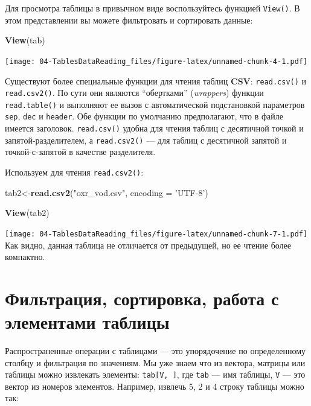 \documentclass[]{book}
\newenvironment{Shaded}{\begin{snugshade}}{\end{snugshade}}
\newcommand{\KeywordTok}[1]{\textcolor[rgb]{0.13,0.29,0.53}{\textbf{#1}}}
\newcommand{\DataTypeTok}[1]{\textcolor[rgb]{0.13,0.29,0.53}{#1}}
\newcommand{\StringTok}[1]{\textcolor[rgb]{0.31,0.60,0.02}{#1}}
\newcommand{\NormalTok}[1]{#1}
\begin{document}
Для просмотра таблицы в привычном виде воспользуйтесь функцией
\texttt{View()}. В этом представлении вы можете фильтровать и
сортировать данные:

\begin{Shaded}
\begin{Highlighting}[]
\KeywordTok{View}\NormalTok{(tab)}
\end{Highlighting}
\end{Shaded}

\texttt{[image: 04-TablesDataReading\_files/figure-latex/unnamed-chunk-4-1.pdf]}

Существуют более специальные функции для чтения таблиц \textbf{CSV}:
\texttt{read.csv()} и \texttt{read.csv2()}. По сути они являются
``обертками'' (\emph{wrappers}) функции \texttt{read.table()} и
выполняют ее вызов с автоматической подстановкой параметров
\texttt{sep}, \texttt{dec} и \texttt{header}. Обе функции по умолчанию
предполагают, что в файле имеется заголовок. \texttt{read.csv()} удобна
для чтения таблиц с десятичной точкой и запятой-разделителем, а
\texttt{read.csv2()} --- для таблиц с десятичной запятой и
точкой-с-запятой в качестве разделителя.

Используем для чтения \texttt{read.csv2()}:

\begin{Shaded}
\begin{Highlighting}[]
\NormalTok{tab2<-}\KeywordTok{read.csv2}\NormalTok{(}\StringTok{"oxr_vod.csv"}\NormalTok{, }\DataTypeTok{encoding =} \StringTok{'UTF-8'}\NormalTok{)}
\end{Highlighting}
\end{Shaded}

\begin{Shaded}
\begin{Highlighting}[]
\KeywordTok{View}\NormalTok{(tab2)}
\end{Highlighting}
\end{Shaded}

\texttt{[image: 04-TablesDataReading\_files/figure-latex/unnamed-chunk-7-1.pdf]}
Как видно, данная таблица не отличается от предыдущей, но ее чтение
более компактно.

\section{Фильтрация, сортировка, работа с элементами
таблицы}\label{filtering_sorting}

Распространенные операции с таблицами --- это упорядочение по
определенному столбцу и фильтрация по значениям. Мы уже знаем что из
вектора, матрицы или таблицы можно извлекать элементы:
\texttt{tab{[}V,\ {]}}, где \texttt{tab} --- имя таблицы, \texttt{V} ---
это вектор из номеров элементов. Например, извлечь 5, 2 и 4 строку
таблицы можно так:
\end{document}
